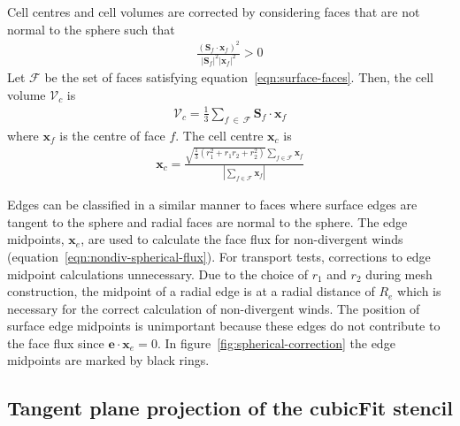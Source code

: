 Cell centres and cell volumes are corrected by considering faces that are not normal to the sphere such that
\begin{align}
	\frac{\left(\mathbf{S}_f \cdot \mathbf{x}_f\right)^2}{\left\lvert \mathbf{S}_f \right\rvert^2 \left\lvert \mathbf{x}_f \right\rvert^2} > 0 \label{eqn:surface-faces}
\end{align}
Let $\mathcal{F}$ be the set of faces satisfying equation~\eqref{eqn:surface-faces}.  Then, the cell volume $\mathcal{V}_c$ is
\begin{align}
	\mathcal{V}_c = \frac{1}{3} \sum_{f\:\in\:\mathcal{F}} \mathbf{S}_f \cdot \mathbf{x}_f
\end{align}
where $\mathbf{x}_f$ is the centre of face $f$.
The cell centre $\mathbf{x}_c$ is
\begin{align}
	\mathbf{x}_c = \frac{\sqrt{\frac{1}{3} \left(r_1^2 + r_1 r_2 + r_2^2\right)}\sum_{f\in\mathcal{F}} \mathbf{x}_f}{\left\lvert \sum_{f\in\mathcal{F}} \mathbf{x}_f \right\rvert}
\end{align}

Edges can be classified in a similar manner to faces where surface edges are tangent to the sphere and radial faces are normal to the sphere.  The edge midpoints, $\mathbf{x}_e$, are used to calculate the face flux for non-divergent winds (equation~\eqref{eqn:nondiv-spherical-flux}).
For transport tests, corrections to edge midpoint calculations unnecessary.  Due to the choice of $r_1$ and $r_2$ during mesh construction, the midpoint of a radial edge is at a radial distance of $R_e$ which is necessary for the correct calculation of non-divergent winds.
The position of surface edge midpoints is unimportant because these edges do not contribute to the face flux since $\mathbf{e} \cdot \mathbf{x}_e = 0$.
In figure~\ref{fig:spherical-correction} the edge midpoints are marked by black rings.

\subsection*{Tangent plane projection of the cubicFit stencil}
